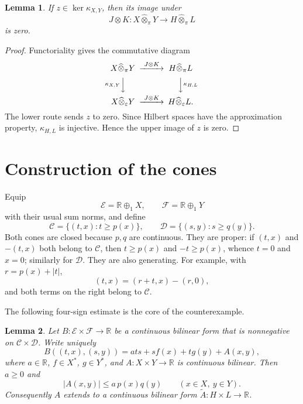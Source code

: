 \documentclass[11pt]{article}
\newtheorem{lemma}{Lemma}
\newcommand{\R}{\mathbb R}
\newcommand{\Espace}{\mathcal E}
\newcommand{\Fspace}{\mathcal F}
\newcommand{\ConeE}{\mathcal C}
\newcommand{\ConeF}{\mathcal D}
\newcommand{\tp}{\widehat\otimes_\pi}
\newcommand{\te}{\widehat\otimes_\varepsilon}
\begin{document}
\begin{lemma}\label{lem:hilbert-kernel}
If $z\in\ker\kappa_{X,Y}$, then its image under
\[
 J\otimes K:X\tp Y\longrightarrow H\tp L
\]
is zero.
\end{lemma}

\begin{proof}
Functoriality gives the commutative diagram
\[
\begin{CD}
X\tp Y @>{J\otimes K}>> H\tp L\\
@V{\kappa_{X,Y}}VV @VV{\kappa_{H,L}}V\\
X\te Y @>{J\otimes K}>> H\te L.
\end{CD}
\]
The lower route sends $z$ to zero.  Since Hilbert spaces have the approximation property, $\kappa_{H,L}$ is injective.  Hence the upper image of $z$ is zero.
\end{proof}

\section{Construction of the cones}

Equip
\[
 \Espace=\R\oplus_1X,\qquad \Fspace=\R\oplus_1Y
\]
with their usual sum norms, and define
\begin{equation}\label{eq:cones}
 \ConeE=\{(t,x):t\ge p(x)\},\qquad
 \ConeF=\{(s,y):s\ge q(y)\}.
\end{equation}
Both cones are closed because $p,q$ are continuous.  They are proper: if $(t,x)$ and $-(t,x)$ both belong to $\ConeE$, then $t\ge p(x)$ and $-t\ge p(x)$, whence $t=0$ and $x=0$; similarly for $\ConeF$.  They are also generating.  For example, with $r=p(x)+|t|$,
\[
 (t,x)=(r+t,x)-(r,0),
\]
and both terms on the right belong to $\ConeE$.

The following four-sign estimate is the core of the counterexample.

\begin{lemma}\label{lem:positive-factor}
Let $B:\Espace\times\Fspace\to\R$ be a continuous bilinear form that is nonnegative on $\ConeE\times\ConeF$.  Write uniquely
\begin{equation}\label{eq:decomposeB}
 B((t,x),(s,y))=a ts+s f(x)+t g(y)+A(x,y),
\end{equation}
where $a\in\R$, $f\in X^*$, $g\in Y^*$, and $A:X\times Y\to\R$ is continuous bilinear.  Then $a\ge0$ and
\begin{equation}\label{eq:domination}
 |A(x,y)|\le a\,p(x)q(y)\qquad(x\in X,\ y\in Y).
\end{equation}
Consequently $A$ extends to a continuous bilinear form $\widetilde A:H\times L\to\R$.
\end{lemma}
\end{document}

